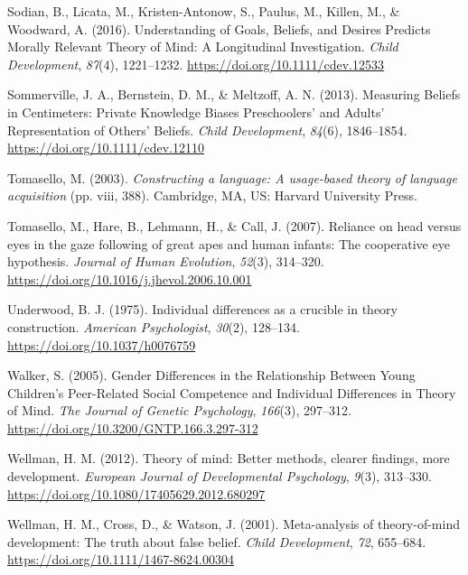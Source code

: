 \documentclass[
  man,floatsintext]{apa7}
\newlength{\cslhangindent}
\newlength{\cslentryspacingunit} %
\newenvironment{CSLReferences}[2] %
 {%
  \setlength{\parindent}{0pt}
  \ifodd #1
  \let\oldpar\par
  \def\par{\hangindent=\cslhangindent\oldpar}
  \fi
  \setlength{\parskip}{#2\cslentryspacingunit}
 }%
 {}
\begin{document}
\begin{CSLReferences}{1}{0}
\leavevmode{}%
Sodian, B., Licata, M., Kristen-Antonow, S., Paulus, M., Killen, M., \& Woodward, A. (2016). Understanding of {Goals}, {Beliefs}, and {Desires Predicts Morally Relevant Theory} of {Mind}: {A Longitudinal Investigation}. \emph{Child Development}, \emph{87}(4), 1221--1232. \url{https://doi.org/10.1111/cdev.12533}

\leavevmode{}%
Sommerville, J. A., Bernstein, D. M., \& Meltzoff, A. N. (2013). Measuring {Beliefs} in {Centimeters}: {Private Knowledge Biases Preschoolers}' and {Adults}' {Representation} of {Others}' {Beliefs}. \emph{Child Development}, \emph{84}(6), 1846--1854. \url{https://doi.org/10.1111/cdev.12110}

\leavevmode{}%
Tomasello, M. (2003). \emph{Constructing a language: {A} usage-based theory of language acquisition} (pp. viii, 388). {Cambridge, MA, US}: {Harvard University Press}.

\leavevmode{}%
Tomasello, M., Hare, B., Lehmann, H., \& Call, J. (2007). Reliance on head versus eyes in the gaze following of great apes and human infants: The cooperative eye hypothesis. \emph{Journal of Human Evolution}, \emph{52}(3), 314--320. \url{https://doi.org/10.1016/j.jhevol.2006.10.001}

\leavevmode{}%
Underwood, B. J. (1975). Individual differences as a crucible in theory construction. \emph{American Psychologist}, \emph{30}(2), 128--134. \url{https://doi.org/10.1037/h0076759}

\leavevmode{}%
Walker, S. (2005). Gender {Differences} in the {Relationship Between Young Children}'s {Peer-Related Social Competence} and {Individual Differences} in {Theory} of {Mind}. \emph{The Journal of Genetic Psychology}, \emph{166}(3), 297--312. \url{https://doi.org/10.3200/GNTP.166.3.297-312}

\leavevmode{}%
Wellman, H. M. (2012). Theory of mind: {Better} methods, clearer findings, more development. \emph{European Journal of Developmental Psychology}, \emph{9}(3), 313--330. \url{https://doi.org/10.1080/17405629.2012.680297}

\leavevmode{}%
Wellman, H. M., Cross, D., \& Watson, J. (2001). Meta-analysis of theory-of-mind development: {The} truth about false belief. \emph{Child Development}, \emph{72}, 655--684. \url{https://doi.org/10.1111/1467-8624.00304}


\end{CSLReferences}
\end{document}
